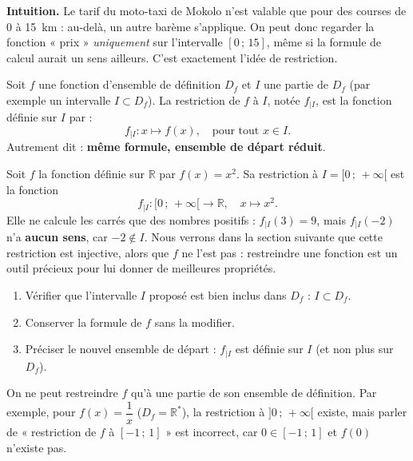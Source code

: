 \documentclass[11pt]{article}
\newcommand{\cle}[1]{{\popxbold\color{popdark}#1}}
\newcounter{popsec}
\newcounter{popsub}
\newcommand{\courssub}[1]{%
  \stepcounter{popsub}%
  \par\vspace{9pt}\noindent{\popxbold\fontsize{11.5}{13}\selectfont\color{popink}{\color{poporange}\thepopsec.\thepopsub}\hspace{6pt}#1}\par\nopagebreak\vspace{4pt}
}
\begin{document}
\courssub{Restriction d'une fonction}

\textbf{Intuition.} Le tarif du moto-taxi de Mokolo n'est valable que pour des courses de $0$ à \SI{15}{km} : au-delà, un autre barème s'applique. On peut donc regarder la fonction « prix » \emph{uniquement} sur l'intervalle $[0\,;\,15]$, même si la formule de calcul aurait un sens ailleurs. C'est exactement l'idée de restriction.

\begin{definition}
Soit $f$ une fonction d'ensemble de définition $D_f$ et $I$ une partie de $D_f$ (par exemple un intervalle $I \subset D_f$). La \cle{restriction} de $f$ à $I$, notée $f_{|I}$, est la fonction définie sur $I$ par :
\[ f_{|I} : x \longmapsto f(x), \quad \text{pour tout } x \in I. \]
Autrement dit : \textbf{même formule, ensemble de départ réduit}.
\end{definition}

\begin{exemplebox}
Soit $f$ la fonction définie sur $\mathbb{R}$ par $f(x) = x^2$. Sa restriction à $I = [0\,;\,+\infty[$ est la fonction
\[ f_{|I} : [0\,;\,+\infty[ \longrightarrow \mathbb{R}, \quad x \longmapsto x^2. \]
Elle ne calcule les carrés que des nombres positifs : $f_{|I}(3) = 9$, mais $f_{|I}(-2)$ n'a \textbf{aucun sens}, car $-2 \notin I$. Nous verrons dans la section suivante que cette restriction est injective, alors que $f$ ne l'est pas : restreindre une fonction est un outil précieux pour lui donner de meilleures propriétés.
\end{exemplebox}

\begin{methode}
\begin{enumerate}
\item Vérifier que l'intervalle $I$ proposé est bien inclus dans $D_f$ : $I \subset D_f$.
\item Conserver la formule de $f$ sans la modifier.
\item Préciser le nouvel ensemble de départ : $f_{|I}$ est définie sur $I$ (et non plus sur $D_f$).
\end{enumerate}
\end{methode}

\begin{attention}
On ne peut restreindre $f$ qu'à une partie de son ensemble de définition. Par exemple, pour $f(x) = \dfrac{1}{x}$ ($D_f = \mathbb{R}^*$), la restriction à $]0\,;\,+\infty[$ existe, mais parler de « restriction de $f$ à $[-1\,;\,1]$ » est incorrect, car $0 \in [-1\,;\,1]$ et $f(0)$ n'existe pas.
\end{attention}
\end{document}
